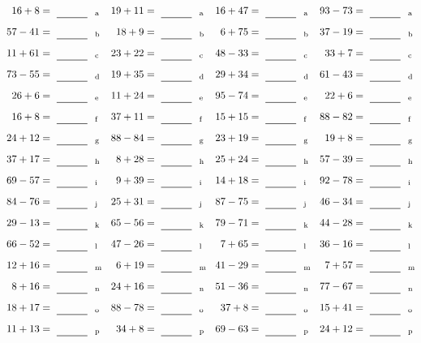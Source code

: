 \documentclass
[
  draft    = true,
  fontsize = 11pt,
  parskip  = half-
]
{scrartcl}
\begin{document}
\clearpage
\begin{align*}
    \pline{16+8}&=\rline{a}
  & \pline{19+11}&=\rline{a}
  & \pline{16+47}&=\rline{a}
  & \pline{93-73}&=\rline{a} \\[1ex]
    \pline{57-41}&=\rline{b}
  & \pline{18+9}&=\rline{b}
  & \pline{6+75}&=\rline{b}
  & \pline{37-19}&=\rline{b} \\[1ex]
    \pline{11+61}&=\rline{c}
  & \pline{23+22}&=\rline{c}
  & \pline{48-33}&=\rline{c}
  & \pline{33+7}&=\rline{c} \\[1ex]
    \pline{73-55}&=\rline{d}
  & \pline{19+35}&=\rline{d}
  & \pline{29+34}&=\rline{d}
  & \pline{61-43}&=\rline{d} \\[1ex]
    \pline{26+6}&=\rline{e}
  & \pline{11+24}&=\rline{e}
  & \pline{95-74}&=\rline{e}
  & \pline{22+6}&=\rline{e} \\[1ex]
    \pline{16+8}&=\rline{f}
  & \pline{37+11}&=\rline{f}
  & \pline{15+15}&=\rline{f}
  & \pline{88-82}&=\rline{f} \\[1ex]
    \pline{24+12}&=\rline{g}
  & \pline{88-84}&=\rline{g}
  & \pline{23+19}&=\rline{g}
  & \pline{19+8}&=\rline{g} \\[1ex]
    \pline{37+17}&=\rline{h}
  & \pline{8+28}&=\rline{h}
  & \pline{25+24}&=\rline{h}
  & \pline{57-39}&=\rline{h} \\[1ex]
    \pline{69-57}&=\rline{i}
  & \pline{9+39}&=\rline{i}
  & \pline{14+18}&=\rline{i}
  & \pline{92-78}&=\rline{i} \\[1ex]
    \pline{84-76}&=\rline{j}
  & \pline{25+31}&=\rline{j}
  & \pline{87-75}&=\rline{j}
  & \pline{46-34}&=\rline{j} \\[1ex]
    \pline{29-13}&=\rline{k}
  & \pline{65-56}&=\rline{k}
  & \pline{79-71}&=\rline{k}
  & \pline{44-28}&=\rline{k} \\[1ex]
    \pline{66-52}&=\rline{l}
  & \pline{47-26}&=\rline{l}
  & \pline{7+65}&=\rline{l}
  & \pline{36-16}&=\rline{l} \\[1ex]
    \pline{12+16}&=\rline{m}
  & \pline{6+19}&=\rline{m}
  & \pline{41-29}&=\rline{m}
  & \pline{7+57}&=\rline{m} \\[1ex]
    \pline{8+16}&=\rline{n}
  & \pline{24+16}&=\rline{n}
  & \pline{51-36}&=\rline{n}
  & \pline{77-67}&=\rline{n} \\[1ex]
    \pline{18+17}&=\rline{o}
  & \pline{88-78}&=\rline{o}
  & \pline{37+8}&=\rline{o}
  & \pline{15+41}&=\rline{o} \\[1ex]
    \pline{11+13}&=\rline{p}
  & \pline{34+8}&=\rline{p}
  & \pline{69-63}&=\rline{p}
  & \pline{24+12}&=\rline{p}
\end{align*}
\end{document}
